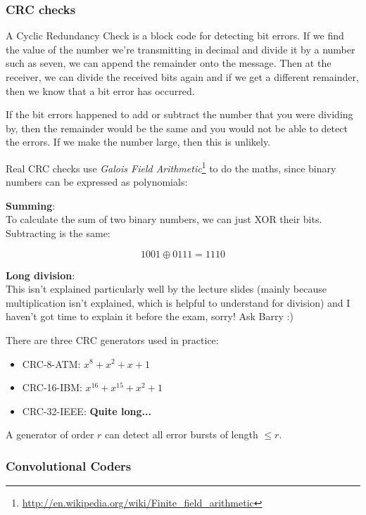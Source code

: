 \subsubsection{CRC checks}

A Cyclic Redundancy Check is a block code for detecting bit errors. If we find
the value of the number we're transmitting in decimal and divide it by a number
such as seven, we can append the remainder onto the message. Then at the
receiver, we can divide the received bits again and if we get a different
remainder, then we know that a bit error has occurred.

If the bit errors happened to add or subtract the number that you were dividing
by, then the remainder would be the same and you would not be able to detect the
errors. If we make the number large, then this is unlikely.

Real CRC checks use \textit{Galois Field Arithmetic}\footnote{
\url{http://en.wikipedia.org/wiki/Finite_field_arithmetic}} to do the maths,
since binary numbers can be expressed as polynomials:

\begin{description}
  \item \textbf{Summing}:\\
    To calculate the sum of two binary numbers, we can just XOR their bits.
    Subtracting is the same:

    \[
      1001 \oplus 0111 = 1110
    \]
  \item \textbf{Long division}:\\
    This isn't explained particularly well by the lecture slides (mainly because
    multiplication isn't explained, which is helpful to understand for division)    
    and I haven't got time to explain it before the exam, sorry! Ask Barry :)
\end{description}

There are three CRC generators used in practice:

\begin{itemize}
  \item CRC-8-ATM: $x^8 + x^2 + x + 1$
  \item CRC-16-IBM: $x^{16} + x^{15} + x^2 + 1$
  \item CRC-32-IEEE: \textbf{Quite long...}
\end{itemize}

A generator of order $r$ can detect all error bursts of length $\leq r$.

\subsubsection{Convolutional Coders}


